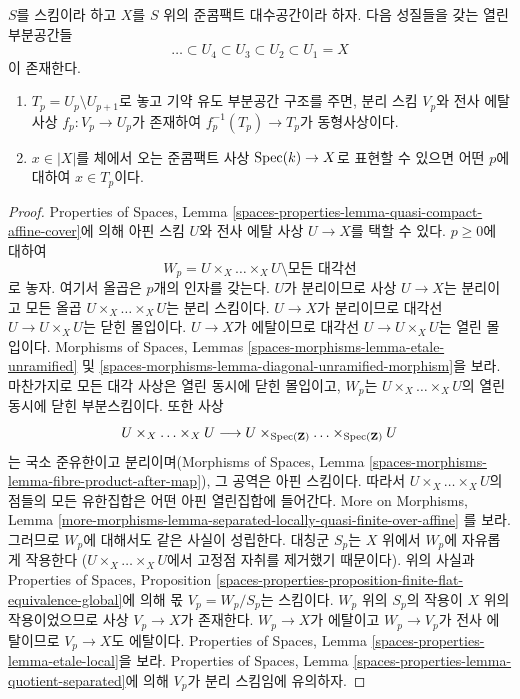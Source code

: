 \begin{lemma}
\label{lemma-filter-quasi-compact}
$S$를 스킴이라 하고 $X$를 $S$ 위의 준콤팩트 대수공간이라 하자.
다음 성질들을 갖는 열린 부분공간들
$$
\ldots \subset U_4 \subset U_3 \subset U_2 \subset U_1 = X
$$
이 존재한다.
\begin{enumerate}
\item $T_p = U_p \setminus U_{p + 1}$로 놓고 기약 유도 부분공간
구조를 주면, 분리 스킴 $V_p$와 전사 에탈 사상
$f_p : V_p \to U_p$가 존재하여
$f_p^{-1}(T_p) \to T_p$가 동형사상이다.
\item $x \in |X|$를 체에서 오는 준콤팩트 사상
$\mathop{\mathrm{Spec}}(k) \to X$로 표현할 수 있으면 어떤 $p$에 대하여 $x \in T_p$이다.
\end{enumerate}
\end{lemma}

\begin{proof}
Properties of Spaces, Lemma
\ref{spaces-properties-lemma-quasi-compact-affine-cover}에 의해 아핀 스킴
$U$와 전사 에탈 사상 $U \to X$를 택할 수 있다.
$p \geq 0$에 대하여
$$
W_p = U \times_X \ldots \times_X U \setminus \text{모든 대각선}
$$
로 놓자. 여기서 올곱은 $p$개의 인자를 갖는다. $U$가 분리이므로
사상 $U \to X$는 분리이고 모든 올곱
$U \times_X \ldots \times_X U$는 분리 스킴이다.
$U \to X$가 분리이므로 대각선 $U \to U \times_X U$는 닫힌 몰입이다.
$U \to X$가 에탈이므로 대각선 $U \to U \times_X U$는 열린 몰입이다.
Morphisms of Spaces, Lemmas
\ref{spaces-morphisms-lemma-etale-unramified} 및
\ref{spaces-morphisms-lemma-diagonal-unramified-morphism}을 보라.
마찬가지로 모든 대각 사상은 열린 동시에 닫힌 몰입이고,
$W_p$는 $U \times_X \ldots \times_X U$의 열린 동시에 닫힌
부분스킴이다. 또한 사상
$$
U \times_X \ldots \times_X U \longrightarrow
U \times_{\mathop{\mathrm{Spec}}(\mathbf{Z})} \ldots \times_{\mathop{\mathrm{Spec}}(\mathbf{Z})} U
$$
는 국소 준유한이고 분리이며(Morphisms of Spaces, Lemma
\ref{spaces-morphisms-lemma-fibre-product-after-map}), 그 공역은
아핀 스킴이다. 따라서 $U \times_X \ldots \times_X U$의 점들의
모든 유한집합은 어떤 아핀 열린집합에 들어간다. More on Morphisms,
Lemma \ref{more-morphisms-lemma-separated-locally-quasi-finite-over-affine}
를 보라. 그러므로 $W_p$에 대해서도 같은 사실이 성립한다.
대칭군 $S_p$는 $X$ 위에서 $W_p$에 자유롭게 작용한다
($U \times_X \ldots \times_X U$에서 고정점 자취를 제거했기 때문이다).
위의 사실과 Properties of Spaces, Proposition
\ref{spaces-properties-proposition-finite-flat-equivalence-global}에
의해 몫 $V_p = W_p/S_p$는 스킴이다. $W_p$ 위의 $S_p$의 작용이
$X$ 위의 작용이었으므로 사상 $V_p \to X$가 존재한다.
$W_p \to X$가 에탈이고 $W_p \to V_p$가 전사 에탈이므로
$V_p \to X$도 에탈이다. Properties of Spaces, Lemma
\ref{spaces-properties-lemma-etale-local}을 보라.
Properties of Spaces, Lemma
\ref{spaces-properties-lemma-quotient-separated}에 의해 $V_p$가
분리 스킴임에 유의하자.


\end{proof}
